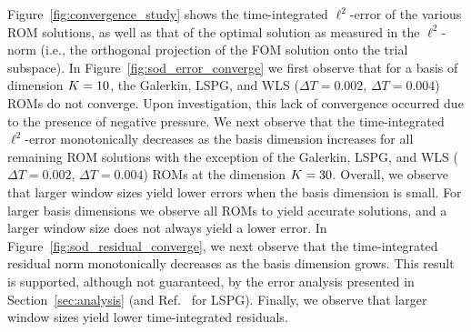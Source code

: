 Figure~\ref{fig:convergence_study} shows the time-integrated $\ell^2$-error of the various ROM solutions, as well as that of the optimal solution as measured in the $\ell^2$-norm (i.e., the orthogonal projection of the FOM solution onto the trial subspace). In Figure~\ref{fig:sod_error_converge} we first observe that for a basis of dimension $K = 10$, the Galerkin, LSPG, and WLS ($\Delta T = 0.002$, $\Delta T = 0.004$) ROMs do not converge. Upon investigation, this lack of convergence occurred due to the presence of negative pressure. We next observe that the time-integrated $\ell^2$-error monotonically decreases as the basis dimension increases for all remaining ROM solutions with the exception of the Galerkin, LSPG, and WLS ($\Delta T = 0.002$, $\Delta T = 0.004$) ROMs at the dimension $K = 30$. Overall, we observe that larger window sizes yield lower errors when the basis dimension is small. For larger basis dimensions we observe all ROMs to yield accurate solutions, and a larger window size does not always yield a lower error. In Figure~\ref{fig:sod_residual_converge}, we next observe that the time-integrated residual norm monotonically decreases as the basis dimension grows. This result is supported, although not guaranteed, by the error analysis presented in Section~\ref{sec:analysis} (and Ref.~\cite{carlberg_lspg_v_galerkin} for LSPG). Finally, we observe that larger window sizes yield lower time-integrated residuals.  

